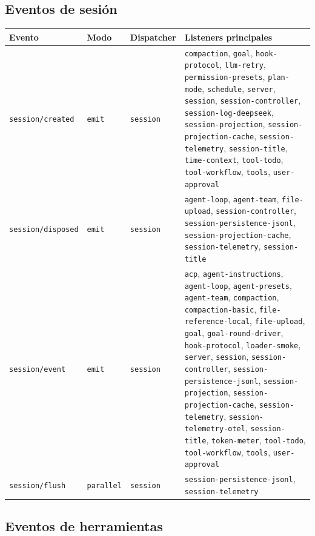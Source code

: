 \documentclass[11pt,a4paper]{article}
\begin{document}
\subsection*{Eventos de sesión}


\begin{center}
\begin{tabular}{@{}llll@{}}
\toprule
Evento & Modo & Dispatcher & Listeners principales \\
\midrule
\texttt{session/created} & \texttt{emit} & \texttt{session} & \texttt{compaction}, \texttt{goal}, \texttt{hook-protocol}, \texttt{llm-retry}, \texttt{permission-presets}, \texttt{plan-mode}, \texttt{schedule}, \texttt{server}, \texttt{session}, \texttt{session-controller}, \texttt{session-log-deepseek}, \texttt{session-projection}, \texttt{session-projection-cache}, \texttt{session-telemetry}, \texttt{session-title}, \texttt{time-context}, \texttt{tool-todo}, \texttt{tool-workflow}, \texttt{tools}, \texttt{user-approval} \\
\texttt{session/disposed} & \texttt{emit} & \texttt{session} & \texttt{agent-loop}, \texttt{agent-team}, \texttt{file-upload}, \texttt{session-controller}, \texttt{session-persistence-jsonl}, \texttt{session-projection-cache}, \texttt{session-telemetry}, \texttt{session-title} \\
\texttt{session/event} & \texttt{emit} & \texttt{session} & \texttt{acp}, \texttt{agent-instructions}, \texttt{agent-loop}, \texttt{agent-presets}, \texttt{agent-team}, \texttt{compaction}, \texttt{compaction-basic}, \texttt{file-reference-local}, \texttt{file-upload}, \texttt{goal}, \texttt{goal-round-driver}, \texttt{hook-protocol}, \texttt{loader-smoke}, \texttt{server}, \texttt{session}, \texttt{session-controller}, \texttt{session-persistence-jsonl}, \texttt{session-projection}, \texttt{session-projection-cache}, \texttt{session-telemetry}, \texttt{session-telemetry-otel}, \texttt{session-title}, \texttt{token-meter}, \texttt{tool-todo}, \texttt{tool-workflow}, \texttt{tools}, \texttt{user-approval} \\
\texttt{session/flush} & \texttt{parallel} & \texttt{session} & \texttt{session-persistence-jsonl}, \texttt{session-telemetry} \\
\bottomrule
\end{tabular}
\end{center}



\subsection*{Eventos de herramientas}
\end{document}
